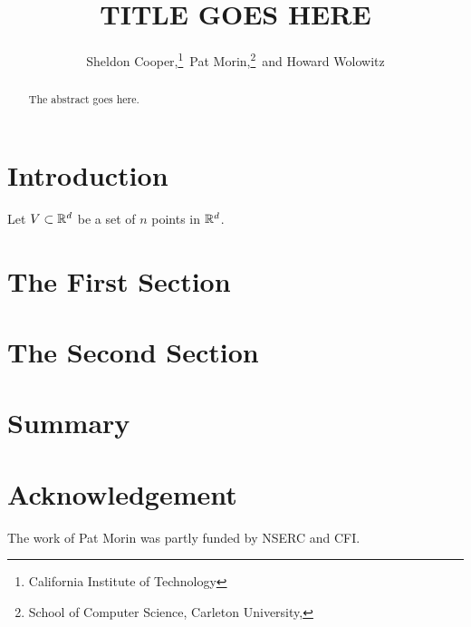 \documentclass{patmorin}
\title{\MakeUppercase{Title Goes Here}}
\author{Sheldon Cooper,\thanks{California Institute of Technology}\,
         Pat Morin,\thanks{School of Computer Science, Carleton University, \email{morin@scs.carleton.ca}}\,
         and Howard Wolowitz\footnotemark[1]}
\begin{document}
\maketitle

\begin{abstract}
  The abstract goes here.
\end{abstract}

\section{Introduction}


Let $V\subset \mathbb{R}^d$ be a set of $n$ points in $\mathbb{R}^d$. 

\section{The First Section}

\section{The Second Section}

\section{Summary}

\section*{Acknowledgement}

The work of Pat Morin was partly funded by NSERC and CFI.



\end{document}

